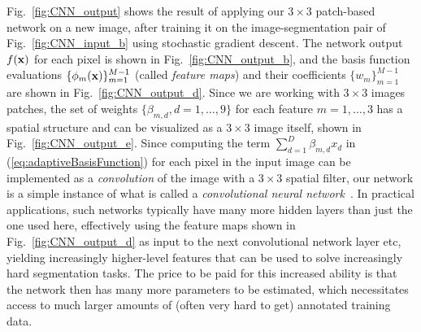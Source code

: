 \documentclass[10pt,twoside]{book}
\begin{document}
Fig.~\ref{fig:CNN_output} shows the result of applying our $3\times3$ patch-based network on a new image,
after training it on the image-segmentation pair of 
Fig.~\ref{fig:CNN_input_b}
using stochastic gradient descent.
The network output $f(\mathbf{x})$ for each pixel is shown in Fig.~\ref{fig:CNN_output_b}, 
and
the basis function evaluations $\{ \phi_m( \mathbf{x} ) \}_{m=1}^{M-1}$ (called \emph{feature maps}) and their coefficients $\{ w_m \}_{m=1}^{M-1}$
are shown 
in Fig.~\ref{fig:CNN_output_d}.
%
Since we are working with $3\times3$ images patches, the set of weights $\{ \beta_{m,d}, d=1,\ldots,9 \}$ for each
feature
$m=1,\ldots,3$ has a spatial structure and 
can be visualized
as a $3\times3$ image itself, shown in Fig.~\ref{fig:CNN_output_e}.
Since computing the term $\sum_{d=1}^D \beta_{m,d} x_{d}$ in (\eqref{eq:adaptiveBasisFunction}) for each pixel in the input image can be implemented as a \emph{convolution} of the image with a $3\times3$ spatial filter, our network is a simple instance of 
what is called
a \emph{convolutional neural network}~\cite{lecun1989backpropagation}.
%
In practical applications, such networks typically have many more hidden layers than just the one used here, 
effectively using the feature maps shown in Fig.~\ref{fig:CNN_output_d} as input to the next convolutional network layer etc, yielding increasingly higher-level features that can 
be used to solve increasingly hard segmentation tasks.
%
The price to be paid for this increased ability is that the network then has many more parameters to be estimated,
which necessitates access to much larger amounts of (often very hard to get) annotated training data.
\end{document}
